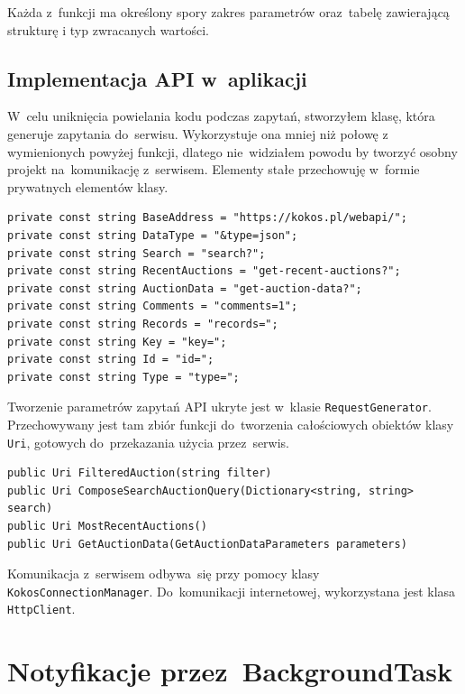 \documentclass[a4paper,twoside,titlepage,openright]{book}
\begin{document}
Każda z~funkcji ma określony spory zakres parametrów oraz~tabelę zawierającą strukturę i typ zwracanych wartości. 


\subsection{Implementacja API w~aplikacji}

W~celu uniknięcia powielania kodu podczas zapytań, stworzyłem klasę, która generuje zapytania do~serwisu. Wykorzystuje ona mniej niż połowę z wymienionych powyżej funkcji, dlatego nie~widziałem powodu by tworzyć osobny projekt na~komunikację z~serwisem. Elementy stałe przechowuję w~formie prywatnych elementów klasy.

\noindent
\begin{lstlisting}[caption=Składowe budujące zapytanie do~serwisu, label=lst:test]
private const string BaseAddress = "https://kokos.pl/webapi/";
private const string DataType = "&type=json";
private const string Search = "search?";
private const string RecentAuctions = "get-recent-auctions?";
private const string AuctionData = "get-auction-data?";
private const string Comments = "comments=1";
private const string Records = "records=";
private const string Key = "key=";
private const string Id = "id=";
private const string Type = "type=";
\end{lstlisting}


Tworzenie parametrów zapytań API ukryte jest w~klasie \texttt{RequestGenerator}. Przechowywany jest tam zbiór funkcji do~tworzenia całościowych obiektów klasy \texttt{Uri}, gotowych do~przekazania użycia przez~serwis.

\noindent
\begin{lstlisting}[caption=Deklaracje metod pozwalających składać zapytania do~serwisu., label=lst:test]
public Uri FilteredAuction(string filter)
public Uri ComposeSearchAuctionQuery(Dictionary<string, string> search)
public Uri MostRecentAuctions()
public Uri GetAuctionData(GetAuctionDataParameters parameters)
\end{lstlisting}

Komunikacja z~serwisem odbywa~się przy pomocy klasy \texttt{KokosConnectionManager}. Do~komunikacji internetowej, wykorzystana jest klasa \texttt{HttpClient}.


\section{Notyfikacje przez~BackgroundTask}
\end{document}
